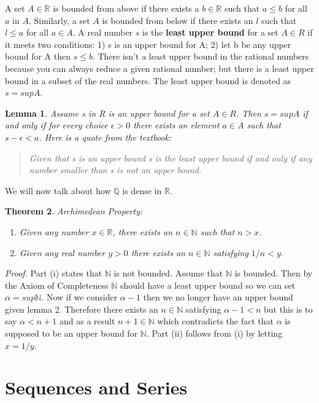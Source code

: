 \documentclass[10pt]{amsbook}
\newtheorem{theorem}{Theorem}
\newtheorem{lemma}[theorem]{Lemma}
\begin{document}
A set $A \in \mathbb{R}$ is bounded from above if there exists a  $b \in \mathbb{R}$ such that $a \le b$ for all $a$ in $A$. Similarly, a set $A$ is bounded from below if there exists an $l$ such that $l \le a$ for all $a \in A$. A real number $s$ is the \textbf{least upper bound} for a set $A \in R$ if it meets two conditions: 1) s is an upper bound for A; 2) let b be any upper bound for A then $s \le b$. There isn’t a least upper bound in the rational numbers because you can always reduce a given rational number; but there is a least upper bound in a subset of the real numbers. The least upper bound is denoted as $s = sup A$.

\begin{lemma}
    Assume s in R is an upper bound for a set $A \in R$. Then $s = sup A$ if and only if for  every choice $\epsilon > 0$ there exists an element $a \in A$ such that $s - \epsilon < a$. Here is a quote from the textbook:
    \begin{quote}
    Given that s is an upper bound s is the least upper bound if and only if any number smaller than s is not  an upper bound.
    \end{quote}
\end{lemma}

We will now talk about how $\mathbb{Q}$ is dense in $\mathbb{R}$.
\begin{theorem}
Archimedean Property: 
\begin{enumerate}[label=(\roman*)]
\item \textit{Given any number $x \in \mathbb{R}$, there exists an $n \in \mathbb{N}$ such that $n > x$}.
\item \textit{Given any real number $y>0$ there exists an $n \in \mathbb{N}$ satisfying $1/n < y$}.
\end{enumerate}

\end{theorem}
\textit{Proof.} Part (i) states that $\mathbb{N}$ is not bounded. Assume that $\mathbb{N}$ is bounded. Then by the Axiom of Completeness $\mathbb{N}$ should have a least upper bound so we can set $\alpha = sup \mathbb{N}$. Now if we consider $\alpha - 1$ then we no longer have an upper bound given lemma 2. Therefore there exists an $n \in \mathbb{N}$ satisfying $\alpha - 1 < n$ but this is to say $\alpha < n + 1$ and as a result $n+1 \in \mathbb{N}$ which contradicts the fact that $\alpha$ is supposed to be an upper bound for $\mathbb{N}$. Part (ii) follows from (i) by letting $x=1/y$.
\chapter{Sequences and Series}
\end{document}

